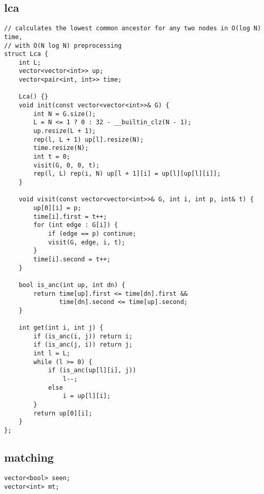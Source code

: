 \documentclass[twoside]{article}
\begin{document}
\begin{multicols*}{2}
{
\subsection*{lca}
}
\begin{verbatim}
// calculates the lowest common ancestor for any two nodes in O(log N) time,
// with O(N log N) preprocessing
struct Lca {
    int L;
    vector<vector<int>> up;
    vector<pair<int, int>> time;

    Lca() {}
    void init(const vector<vector<int>>& G) {
        int N = G.size();
        L = N <= 1 ? 0 : 32 - __builtin_clz(N - 1);
        up.resize(L + 1);
        rep(l, L + 1) up[l].resize(N);
        time.resize(N);
        int t = 0;
        visit(G, 0, 0, t);
        rep(l, L) rep(i, N) up[l + 1][i] = up[l][up[l][i]];
    }

    void visit(const vector<vector<int>>& G, int i, int p, int& t) {
        up[0][i] = p;
        time[i].first = t++;
        for (int edge : G[i]) {
            if (edge == p) continue;
            visit(G, edge, i, t);
        }
        time[i].second = t++;
    }

    bool is_anc(int up, int dn) {
        return time[up].first <= time[dn].first &&
               time[dn].second <= time[up].second;
    }

    int get(int i, int j) {
        if (is_anc(i, j)) return i;
        if (is_anc(j, i)) return j;
        int l = L;
        while (l >= 0) {
            if (is_anc(up[l][i], j))
                l--;
            else
                i = up[l][i];
        }
        return up[0][i];
    }
};
\end{verbatim}

{
\subsection*{matching}
}
\begin{verbatim}
vector<bool> seen;
vector<int> mt;


\end{verbatim}
\end{multicols*}
\end{document}
